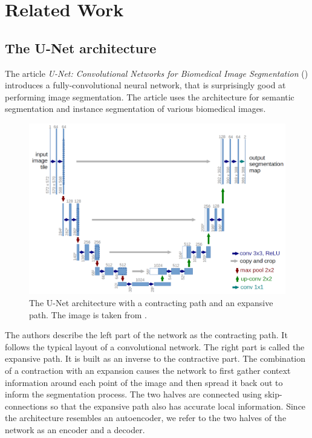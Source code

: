 \chapter{Related Work}
\label{chap:RelatedWork}

\section{The U-Net architecture}

The article \emph{U-Net: Convolutional Networks for Biomedical Image Segmentation} (\cite{UNet}) introduces a fully-convolutional neural network, that is surprisingly good at performing image segmentation. The article uses the architecture for semantic segmentation and instance segmentation of various biomedical images.

\begin{figure}[ht]
    \centering
    \includegraphics[width=145mm]{../img/u-net-architecture.png}
    \caption{The U-Net architecture with a contracting path and an expansive path. The image is taken from \cite{UNet}.}
    \label{fig:UNetArchitecture}
\end{figure}

The authors describe the left part of the network as the contracting path. It follows the typical layout of a convolutional network. The right part is called the expansive path. It is built as an inverse to the contractive part. The combination of a contraction with an expansion causes the network to first gather context information around each point of the image and then spread it back out to inform the segmentation process. The two halves are connected using skip-connections so that the expansive path also has accurate local information. Since the architecture resembles an autoencoder, we refer to the two halves of the network as an encoder and a decoder.


